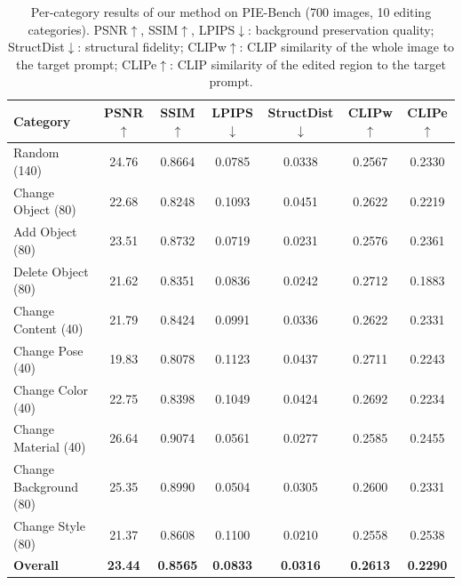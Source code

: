 \begin{table}[t]
\centering
\caption{Per-category results of our method on PIE-Bench (700 images, 10 editing
categories). PSNR$\uparrow$, SSIM$\uparrow$, LPIPS$\downarrow$: background
preservation quality; StructDist$\downarrow$: structural fidelity;
CLIPw$\uparrow$: CLIP similarity of the whole image to the target prompt;
CLIPe$\uparrow$: CLIP similarity of the edited region to the target prompt.}
\label{tab:category_scores}
\footnotesize
\setlength{\tabcolsep}{6pt}
\begin{tabular}{@{}lcccccc@{}}
\toprule
Category & PSNR$\uparrow$ & SSIM$\uparrow$ & LPIPS$\downarrow$ & StructDist$\downarrow$ & CLIPw$\uparrow$ & CLIPe$\uparrow$ \\
\midrule
Random (140)            & 24.76 & 0.8664 & 0.0785 & 0.0338 & 0.2567 & 0.2330 \\
Change Object (80)      & 22.68 & 0.8248 & 0.1093 & 0.0451 & 0.2622 & 0.2219 \\
Add Object (80)         & 23.51 & 0.8732 & 0.0719 & 0.0231 & 0.2576 & 0.2361 \\
Delete Object (80)      & 21.62 & 0.8351 & 0.0836 & 0.0242 & 0.2712 & 0.1883 \\
Change Content (40)     & 21.79 & 0.8424 & 0.0991 & 0.0336 & 0.2622 & 0.2331 \\
Change Pose (40)        & 19.83 & 0.8078 & 0.1123 & 0.0437 & 0.2711 & 0.2243 \\
Change Color (40)       & 22.75 & 0.8398 & 0.1049 & 0.0424 & 0.2692 & 0.2234 \\
Change Material (40)    & 26.64 & 0.9074 & 0.0561 & 0.0277 & 0.2585 & 0.2455 \\
Change Background (80)  & 25.35 & 0.8990 & 0.0504 & 0.0305 & 0.2600 & 0.2331 \\
Change Style (80)       & 21.37 & 0.8608 & 0.1100 & 0.0210 & 0.2558 & 0.2538 \\
\midrule
\textbf{Overall}        & \textbf{23.44} & \textbf{0.8565} & \textbf{0.0833} & \textbf{0.0316} & \textbf{0.2613} & \textbf{0.2290} \\
\bottomrule
\end{tabular}
\end{table}
